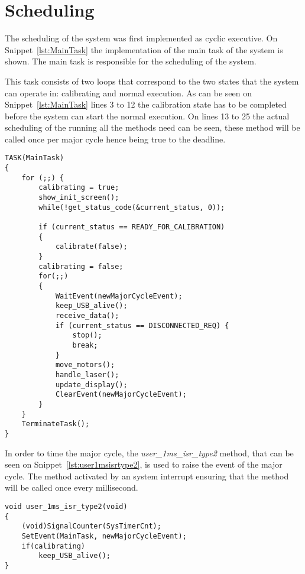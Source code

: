 \section{Scheduling}\label{solution:scheduling}
The scheduling of the system was first implemented as cyclic executive. 
On Snippet~\ref{lst:MainTask} the implementation of the main task of the system is shown. 
The main task is responsible for the scheduling of the system.

This task consists of two loops that correspond to the two states that the system can operate in: calibrating and normal execution.
As can be seen on Snippet~\ref{lst:MainTask} lines 3 to 12 the calibration state has to be completed before the system can start the normal execution. 
On lines 13 to 25 the actual scheduling of the running all the methods need can be seen, these method will be called once per major cycle hence being true to the deadline. 

\begin{lstlisting}[language=CSharp,label={lst:MainTask},caption={MainTaks method from logic.c}]
TASK(MainTask)
{
    for (;;) {
        calibrating = true;
        show_init_screen();
        while(!get_status_code(&current_status, 0));

        if (current_status == READY_FOR_CALIBRATION)
        {
            calibrate(false);
        }
        calibrating = false;
        for(;;)
        {
            WaitEvent(newMajorCycleEvent);
            keep_USB_alive();
            receive_data();
            if (current_status == DISCONNECTED_REQ) {
                stop();
                break;
            }
            move_motors();
            handle_laser();
            update_display();
            ClearEvent(newMajorCycleEvent); 
        }
    }
    TerminateTask();
}
\end{lstlisting}

In order to time the major cycle, the \textit{user\_1ms\_isr\_type2} method, that can be seen on Snippet~\ref{lst:user1msisrtype2}, is used to raise the event of the major cycle. 
The method activated by an system interrupt ensuring that the method will be called once every millisecond. 
\begin{lstlisting}[language=CSharp,label={lst:user1msisrtype2},caption={user\_1ms\_isr\_type2 method from nxt.c}]
void user_1ms_isr_type2(void)
{
    (void)SignalCounter(SysTimerCnt);
    SetEvent(MainTask, newMajorCycleEvent);
    if(calibrating)
        keep_USB_alive();
}
\end{lstlisting}

